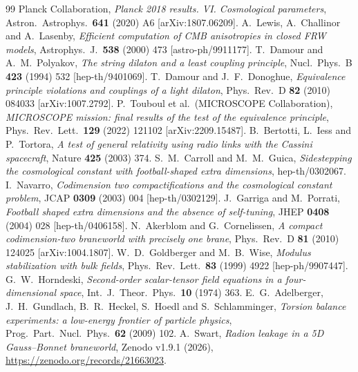 \documentclass[11pt,a4paper]{article}
\begin{document}
\begin{thebibliography}{99}
\small
{} Planck Collaboration, \emph{Planck 2018 results. VI.
Cosmological parameters}, Astron.\ Astrophys.\ \textbf{641} (2020) A6
[arXiv:1807.06209].
 A.~Lewis, A.~Challinor and A.~Lasenby, \emph{Efficient computation of
CMB anisotropies in closed FRW models}, Astrophys.\ J.\ \textbf{538} (2000) 473
[astro-ph/9911177].
 T.~Damour and A.~M.~Polyakov, \emph{The string dilaton and a
least coupling principle}, Nucl.\ Phys.\ B \textbf{423} (1994) 532
[hep-th/9401069].
 T.~Damour and J.~F.~Donoghue, \emph{Equivalence principle
violations and couplings of a light dilaton}, Phys.\ Rev.\ D \textbf{82} (2010)
084033 [arXiv:1007.2792].
 P.~Touboul et al.\ (MICROSCOPE Collaboration), \emph{MICROSCOPE
mission: final results of the test of the equivalence principle}, Phys.\ Rev.\ Lett.\
\textbf{129} (2022) 121102 [arXiv:2209.15487].
 B.~Bertotti, L.~Iess and P.~Tortora, \emph{A test of general
relativity using radio links with the Cassini spacecraft}, Nature \textbf{425}
(2003) 374.
 S.~M.~Carroll and M.~M.~Guica, \emph{Sidestepping the
cosmological constant with football-shaped extra dimensions}, hep-th/0302067.
\bibitem{navarro03} I.~Navarro, \emph{Codimension two compactifications and the
cosmological constant problem}, JCAP \textbf{0309} (2003) 004 [hep-th/0302129].
\bibitem{garriga04} J.~Garriga and M.~Porrati, \emph{Football shaped extra
dimensions and the absence of self-tuning}, JHEP \textbf{0408} (2004) 028
[hep-th/0406158].
 N.~Akerblom and G.~Cornelissen, \emph{A compact codimension-two
braneworld with precisely one brane}, Phys.\ Rev.\ D \textbf{81} (2010) 124025
[arXiv:1004.1807].
 W.~D.~Goldberger and M.~B.~Wise, \emph{Modulus stabilization with
bulk fields}, Phys.\ Rev.\ Lett.\ \textbf{83} (1999) 4922 [hep-ph/9907447].
\bibitem{horndeski} G.~W.~Horndeski, \emph{Second-order scalar-tensor field
equations in a four-dimensional space}, Int.\ J.\ Theor.\ Phys.\ \textbf{10} (1974)
363.
 E.~G.~Adelberger, J.~H.~Gundlach, B.~R.~Heckel, S.~Hoedl and
S.~Schlamminger, \emph{Torsion balance experiments: a low-energy frontier of
particle physics}, Prog.\ Part.\ Nucl.\ Phys.\ \textbf{62} (2009) 102.
\bibitem{zenodo191} A.~Swart, \emph{Radion leakage in a 5D Gauss--Bonnet braneworld},
Zenodo v1.9.1 (2026), \url{https://zenodo.org/records/21663023}.
\end{thebibliography}
\end{document}
